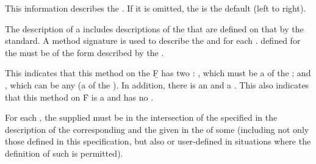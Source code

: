 \endsubsubsection%


This information describes the .
If it is omitted, the  is the default (left to right).

\endsubsubsection%


The description of a  includes descriptions of the
 that are defined on that  by the standard.  
A method signature is used to describe the  and 
 for each . 
 defined for the  must be of the form described
by the  . 

 {
	      {\opt}  {\key} }

\noindent This  indicates that this method on the 
\b{F} has two :
     , which must be a  of the  ;
 and , which can  be any  
       (\ie a  of the  ).
In addition, there is an   and a
 .  This  also indicates that this
method on \f{F} is a  and has no .

For each , the  supplied must be in the
intersection of the  specified in the description of the
corresponding  and the  given in 
the  of some  (including not only those 
 defined in this specification, but also
 or user-defined  in situations
where the definition of such  is permitted).

